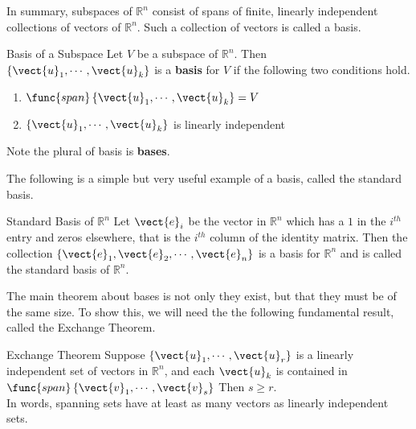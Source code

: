 In summary, subspaces of $\mathbb{R}^{n}$ consist of spans of finite,
linearly independent collections of vectors of $\mathbb{R}^{n}$.  Such
a collection of vectors is called a basis. 

\begin{definition}{Basis of a Subspace}\label{def:subspacebasis}
Let $V$ be a subspace of $\mathbb{R}^{n}$. Then $\left\{
\vect{u}_{1},\cdots ,\vect{u}_{k}\right\} $ is a \textbf{basis} for $V$ if the following two conditions hold.

\begin{enumerate}
\item $\func{span}\left\{ \vect{u}_{1},\cdots ,\vect{u}_{k}\right\} =V$
\item $\left\{ \vect{u}_{1},\cdots ,\vect{u}_{k}\right\} $ is linearly
independent
\end{enumerate}

Note the plural of basis is \textbf{bases}.
\end{definition}

The following is a simple but very useful example of a basis, called the standard basis.

\begin{definition}{Standard Basis of $\mathbb{R}^n$}\label{def:standardbasis}
Let $\vect{e}_i$ be the vector in $\mathbb{R}^n$ which has a $1$ in the $i^{th}$ entry and zeros elsewhere, that is the $i^{th}$ column of the identity matrix. Then the collection $\left\{\vect{e}_1, \vect{e}_2, \cdots, \vect{e}_n
\right\}$ is a basis for
$\mathbb{R}^n$ and is called the standard basis of $\mathbb{R}^n$.
\end{definition}

The main theorem about bases is not only they exist, but that they
must be of the same size. To show this, we will need the the following
fundamental result, called the Exchange Theorem.

\begin{theorem}{Exchange Theorem}\label{thm:exchangetheorem}
Suppose $\left\{ \vect{u}_{1},\cdots ,\vect{u}_{r}\right\} $ is a
linearly independent set of vectors in $\mathbb{R}^n$, and each
$\vect{u}_{k}$ is contained in $\func{span}\left\{ \vect{v}_{1},\cdots
,\vect{v}_{s}\right\}$ Then $s\geq r.$ \\
In words, spanning  sets have at least as many vectors as linearly
independent sets.
\end{theorem}

